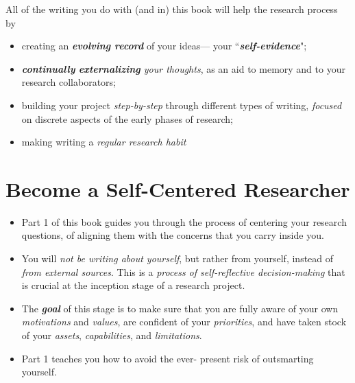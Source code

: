 \documentclass[11pt]{article}
\begin{document}
\begin{itemize}
\begin{exercise}
All of the writing you do with (and in) this book will help the research process by
\begin{itemize}
\item creating an \emph{\textbf{evolving record}} of your ideas— your ``\emph{\textbf{self-evidence}}";
\item \emph{\textbf{continually} \textbf{externalizing} your thoughts}, as an aid to memory and to your research collaborators;
\item building your project \emph{step-by-step} through different types of writing, \emph{focused} on discrete aspects of the early phases of research;
\item making writing a \emph{regular research habit}
\end{itemize}
\end{exercise}
\end{itemize}

\section{Become a Self-Centered Researcher}
\begin{itemize}
\item Part 1 of this book guides you through the process of centering your research questions, of aligning them with the concerns that you carry inside you.

\item You will \emph{not be writing about yourself}, but rather from yourself, instead of \emph{from external sources}. This is a \emph{process of self-reflective decision-making} that is crucial at the inception stage of a research project.

\item The \emph{\textbf{goal}} of this stage is to make sure that you are fully aware of your own \emph{motivations} and \emph{values}, are confident of your \emph{priorities}, and have taken stock of your \emph{assets}, \emph{capabilities}, and \emph{limitations}. 

\item Part 1 teaches you how to avoid the ever- present risk of outsmarting yourself.

\end{itemize}
\end{document}
